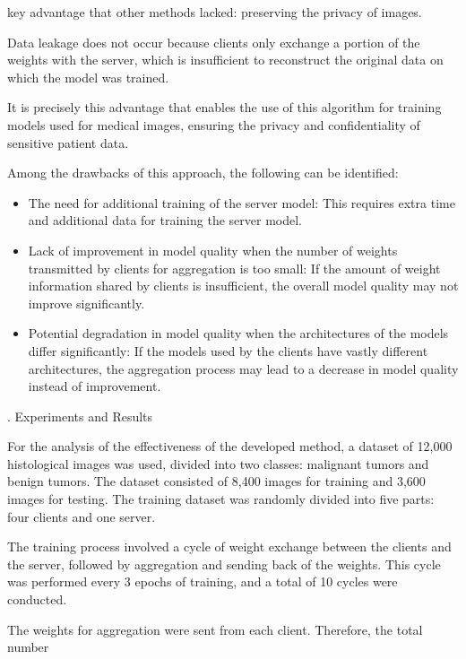 \documentclass[twotcolumn]{scndocument}
\newcommand{\RNumb}[1]{\uppercase\expandafter{\romannumeral #1\relax}}
\begin{document}
\begin{multicols}{2}
key advantage that other methods lacked: preserving the
privacy of images.
\par Data leakage does not occur because clients only
exchange a portion of the weights with the server, which
is insufficient to reconstruct the original data on which
the model was trained.
\par It is precisely this advantage that enables the use of this
algorithm for training models used for medical images,
ensuring the privacy and confidentiality of sensitive
patient data.
\par Among the drawbacks of this approach, the following
can be identified: \begin{itemize}
\item The need for additional training of the server model:
This requires extra time and additional data for
training the server model.
\item Lack of improvement in model quality when the
number of weights transmitted by clients for aggregation is too small: If the amount of weight
information shared by clients is insufficient, the
overall model quality may not improve significantly.
\item Potential degradation in model quality when the
architectures of the models differ significantly: If
the models used by the clients have vastly different
architectures, the aggregation process may lead to a
decrease in model quality instead of improvement. \end{itemize}
\vspace{3mm} \begin{center}
\RNumb{5}. Experiments and Results
\end{center} \vspace{2mm}
\par For the analysis of the effectiveness of the developed
method, a dataset of 12,000 histological images was
used, divided into two classes: malignant tumors and
benign tumors. The dataset consisted of 8,400 images
for training and 3,600 images for testing. The training
dataset was randomly divided into five parts: four clients
and one server.
\par The training process involved a cycle of weight exchange between the clients and the server, followed by
aggregation and sending back of the weights. This cycle
was performed every 3 epochs of training, and a total of
10 cycles were conducted.
\par The weights for aggregation
were sent from each client. Therefore, the total number

\end{multicols}
\end{document}
